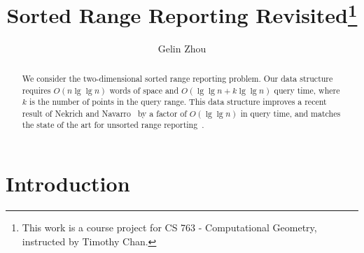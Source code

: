 \documentclass{llncs}
\begin{document}
\title{Sorted Range Reporting Revisited\thanks{This work is a course project for CS 763 - Computational Geometry, instructed by Timothy Chan.}}

\author{Gelin Zhou}

\maketitle



\begin{abstract}
    We consider the two-dimensional sorted range reporting problem.
    Our data structure requires $O(n\lg\lg n)$ words of space and $O(\lg\lg n + k\lg\lg n)$ query time,
    where $k$ is the number of points in the query range.
    This data structure improves a recent result of Nekrich and Navarro~\cite{DBLP:conf/swat/NekrichN12} by a factor of $O(\lg\lg n)$ in query time,
    and matches the state of the art for unsorted range reporting~\cite{DBLP:conf/compgeom/ChanLP11}.
\end{abstract}

\section{Introduction}
\end{document}

